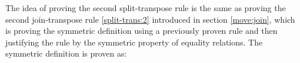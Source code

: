 \documentclass{l4proj}
\begin{document}
The idea of proving the second split-transpose rule is the same as proving the second join-transpose rule \ref{split-trans:2} introduced in section \ref{move:join}, which is proving the symmetric definition using a previously proven rule and then justifying the rule by the symmetric property of equality relations. The symmetric definition is proven as:
\begin{code}%
\>[0]\<%
\\
\>[0]\AgdaSpace{}%
\AgdaSymbol{:}%
\>[613I]\AgdaSymbol{\{}\AgdaSpace{}%
\AgdaSpace{}%
\AgdaSpace{}%
\AgdaSymbol{:}\AgdaSpace{}%
\AgdaSymbol{\}}\AgdaSpace{}%
\AgdaSpace{}%
\AgdaSymbol{\{}\AgdaSpace{}%
\AgdaSymbol{:}\AgdaSpace{}%
\AgdaSymbol{\}}\AgdaSpace{}%
\AgdaSpace{}%
\AgdaSymbol{(}\AgdaSpace{}%
\AgdaSymbol{:}\AgdaSpace{}%
\AgdaSymbol{)}\AgdaSpace{}%
\<%
\\
\>[.][@{}l@{}]\<[613I]%
\>[11]\AgdaSymbol{(}\AgdaSpace{}%
\AgdaSymbol{:}\AgdaSpace{}%
\AgdaSpace{}%
\AgdaSymbol{(}\AgdaSpace{}%
\AgdaSymbol{(}\AgdaSpace{}%
\AgdaSpace{}%
\AgdaSymbol{)}\AgdaSpace{}%
\AgdaSymbol{(}\AgdaSpace{}%
\AgdaOperator{\AgdaPrimitive{*}}\AgdaSpace{}%
\AgdaSymbol{))}\AgdaSpace{}%
\AgdaSymbol{)}\AgdaSpace{}%
\<%
\\
\>[0][@{}l@{\AgdaIndent{0}}]%
\>[2]\AgdaSpace{}%
\AgdaSpace{}%
\AgdaSymbol{(}\AgdaSpace{}%
\AgdaSpace{}%
\AgdaSymbol{(}\AgdaSpace{}%
\AgdaSymbol{))}\AgdaSpace{}%
\AgdaSpace{}%
\AgdaSpace{}%
\AgdaSymbol{(}\AgdaSpace{}%
\AgdaSymbol{(}\AgdaSpace{}%
\AgdaSpace{}%
\AgdaSymbol{\{}\AgdaSymbol{\})}\AgdaSpace{}%
\AgdaSymbol{)}\<%
\\
\>[0]\AgdaSpace{}%
\AgdaSpace{}%
\AgdaSpace{}%
\AgdaSymbol{=}\<%
\\
\>[0][@{}l@{\AgdaIndent{0}}]%
\>[2]\<%
\\
\>[2][@{}l@{\AgdaIndent{0}}]%

\end{code}
\end{document}

